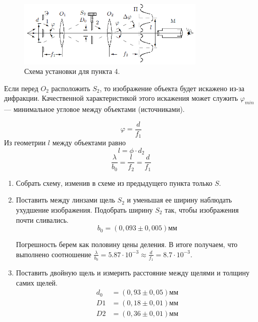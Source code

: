 \documentclass[a4paper]{article}
\begin{document}
\begin{figure}[h]
\begin{center}
\includegraphics[width = 0.8\textwidth]{degradation.png}
\caption{Схема установки для пункта 4.}
\end{center}
\end{figure}

Если перед $O_2$ расположить $S_2$, то изображение объекта будет искажено из-за дифракции. Качественной характеристикой этого искажения может служить $\varphi_{min}$ --- минимальное угловое между объектами (источниками). 

\begin{equation*}
\varphi = \frac{d}{f_1}
\end{equation*}
Из геометрии $l$ между объектами равно 
\begin{equation*}
l = \phi \cdot d_2
\end{equation*}
\begin{equation*}
\dfrac{\lambda}{b_0} = \dfrac{l}{f_2} = \dfrac{d}{f_1}
\end{equation*}
\begin{enumerate}
\item Собрать схему, изменив в схеме из предыдущего пункта только $S$.
\item Поставить между линзами щель $S_2$ и уменьшая ее ширину наблюдать ухудшение изображения. Подобрать ширину $S_2$ так, чтобы изображения почти сливались.
\[b_0 = (0,093 \pm 0,005)\text{мм}\]


Погрешность берем как половину цены деления.
В итоге получаем, что выполнено соотношение $\frac{\lambda}{b_0} = 5.87 \cdot 10^{-3} \approx \frac{d}{f_1} = 8.7 \cdot 10^{-3}$.
\item Поставить двойную щель и измерить расстояние между щелями и толщину самих щелей.
\begin{align*}
    d_0 &= (0,93 \pm 0,05) \text{мм}\\
    D1 &= (0,18 \pm 0,01) \text{мм}\\
    D2 &= (0,36 \pm 0,01) \text{мм}\\
\end{align*}

\end{enumerate}
\end{document}
